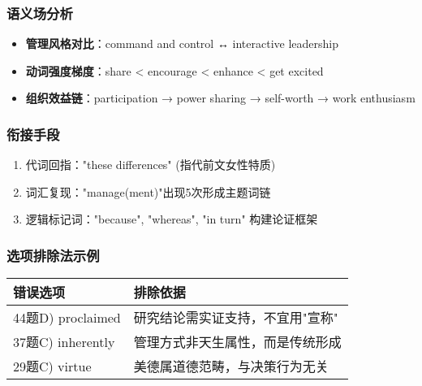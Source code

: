 \documentclass{article}
\begin{document}
\subsubsection*{语义场分析}
\begin{itemize}
    \item \textbf{管理风格对比}：command and control ↔ interactive leadership
    \item \textbf{动词强度梯度}：share < encourage < enhance < get excited
    \item \textbf{组织效益链}：participation → power sharing → self-worth → work enthusiasm
\end{itemize}

\subsubsection*{衔接手段}
\begin{enumerate}
    \item 代词回指："these differences" (指代前文女性特质)
    \item 词汇复现："manage(ment)"出现5次形成主题词链
    \item 逻辑标记词："because", "whereas", "in turn" 构建论证框架
\end{enumerate}

\subsubsection*{选项排除法示例}
\begin{tabular}{|l|l|}
\hline
\textbf{错误选项} & \textbf{排除依据} \\
\hline
44题D) proclaimed & 研究结论需实证支持，不宜用"宣称" \\
37题C) inherently & 管理方式非天生属性，而是传统形成 \\
29题C) virtue & 美德属道德范畴，与决策行为无关 \\
\hline
\end{tabular}
\end{document}
